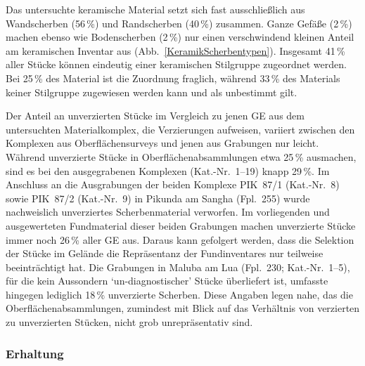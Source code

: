 Das untersuchte keramische Material setzt sich fast ausschließlich aus Wandscherben (56\,\%) und Randscherben (40\,\%) zusammen. Ganze Gefäße (2\,\%) machen ebenso wie Bodenscherben (2\,\%) nur einen verschwindend kleinen Anteil am keramischen Inventar aus (Abb.~\ref{KeramikScherbentypen}). Insgesamt 41\,\% aller Stücke können eindeutig einer keramischen Stilgruppe zugeordnet werden. Bei 25\,\% des Material ist die Zuordnung fraglich, während 33\,\% des Materials keiner Stilgruppe zugewiesen werden kann und als unbestimmt gilt.

Der Anteil an unverzierten Stücke im Vergleich zu jenen GE aus dem untersuchten Materialkomplex, die Verzierungen aufweisen, variiert zwischen den Komplexen aus Oberflächensurveys und jenen aus Grabungen nur leicht. Während unverzierte Stücke in Oberflächenabsammlungen etwa 25\,\% ausmachen, sind es bei den ausgegrabenen Komplexen (Kat.-Nr.~1--19) knapp 29\,\%. Im Anschluss an die Ausgrabungen der beiden Komplexe PIK~87/1 (Kat.-Nr.~8) sowie PIK~87/2 (Kat.-Nr.~9) in Pikunda am Sangha (Fpl.~255) wurde nachweislich unverziertes Scherbenmaterial verworfen. Im vorliegenden und ausgewerteten Fundmaterial dieser beiden Grabungen machen unverzierte Stücke immer noch 26\,\% aller GE aus. Daraus kann gefolgert werden, dass die Selektion der Stücke im Gelände die Repräsentanz der Fundinventares nur teilweise beeinträchtigt hat. Die Grabungen in Maluba am Lua (Fpl.~230; Kat.-Nr.~1--5), für die kein Aussondern \enquote*{un-diagnostischer} Stücke überliefert ist, umfasste hingegen lediglich 18\,\% unverzierte Scherben. Diese Angaben legen nahe, das die Oberflächenabsammlungen, zumindest mit Blick auf das Verhältnis von verzierten zu unverzierten Stücken, nicht grob unrepräsentativ sind.


\subsubsection{Erhaltung}


